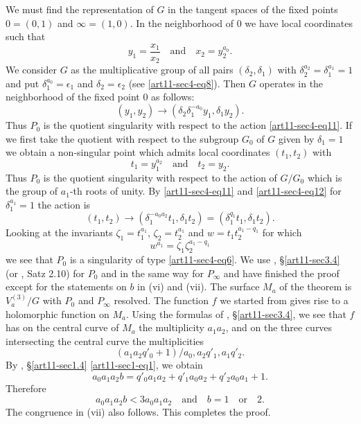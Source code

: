 We must find the representation of $G$ in the tangent spaces of the fixed points $0=(0,1)$ and $\infty=(1,0)$. In the neighborhood of $0$ we have local coordinates such that
\begin{equation}
y_{1}=\dfrac{x_{1}}{x_{2}}\quad\text{and}\quad x_{2}=y^{a_{0}}_{2}.\label{art11-sec4-eq10}
\end{equation}
We consider $G$ as the multiplicative group of all pairs $(\delta_{2},\delta_{1})$ with $\delta^{a_{2}}_{2}=\delta^{a_{1}}_{1}=1$ and put $\delta^{a_{0}}_{1}=\epsilon_{1}$ and $\delta_{2}=\epsilon_{2}$ (see \eqref{art11-sec4-eq8}). Then $G$ operates in the neighborhood of the fixed point $0$ as follows:
\begin{equation}
(y_{1},y_{2})\to (\delta_{2}\delta^{-a_{0}}_{1}y_{1}, \delta_{1}y_{2}).\label{art11-sec4-eq11}
\end{equation}
Thus $P_{0}$ is the quotient singularity with respect to the action \eqref{art11-sec4-eq11}. If we first take the quotient with respect to the subgroup $G_{0}$ of $G$ given by $\delta_{1}=1$ we obtain a non-singular point which admits local coordinates $(t_{1},t_{2})$ with
\begin{equation}
t_{1}=y^{a_{2}}_{1}\quad\text{and}\quad t_{2}=y_{2}.\label{art11-sec4-eq12}
\end{equation}
Thus $P_{0}$ is the quotient singularity with respect to the action of $G/G_{0}$ which is the group of $a_{1}$-th roots of unity. By \eqref{art11-sec4-eq11} and \eqref{art11-sec4-eq12} for $\delta^{a_{1}}_{1}=1$ the action is
\begin{equation}
(t_{1},t_{2})\to (\delta^{-a_{0}a_{2}}_{1}t_{1},\delta_{1}t_{2})=(\delta^{q_{1}}_{1}t_{1},\delta_{1}t_{2}).\label{art11-sec4-eq13}
\end{equation}
Looking at the invariants $\zeta_{1}=t^{a_{1}}_{1}$, $\zeta_{2}=t^{a_{1}}_{2}$ and $w=t_{1}t^{a_{1}-q_{1}}_{2}$ for which
$$
w^{a_{1}}=\zeta_{1}\zeta^{a_{1}-q_{1}}_{2}
$$
we see that $P_{0}$ is a singularity of type \eqref{art11-sec4-eq6}. We use \cite{art11-key6}, \S\ref{art11-sec3.4} (or \cite{art11-key2}, Satz 2.10) for $P_{0}$ and in the same way for $P_{\infty}$ and have finished the proof except for the statements on $b$ in (vi) and (vii). The surface $M_{a}$ of the theorem is $V^{(3)}_{a}/G$ with $P_{0}$ and $P_{\infty}$ resolved. The function $f$ we started from gives rise to a holomorphic function on $M_{a}$. Using the formulas of \cite{art11-key6}, \S\ref{art11-sec3.4}, we see that $f$ has on the central curve of $M_{a}$ the multiplicity $a_{1}a_{2}$, and on the three curves intersecting the central curve the multiplicities 
$$
(a_{1}a_{2}q'_{0}+1)/a_{0},a_{2}q'_{1},a_{1}q'_{2}.
$$\pageoriginale
By \cite{art11-key6}, \S\ref{art11-sec1.4} \eqref{art11-sec1-eq1}, we obtain
$$
a_{0}a_{1}a_{2}b=q'_{0}a_{1}a_{2}+q'_{1}a_{0}a_{2}+q'_{2}a_{0}a_{1}+1.
$$
Therefore
$$
a_{0}a_{1}a_{2}b<3a_{0}a_{1}a_{2}\quad\text{and}\quad b=1\quad\text{or}\quad 2.
$$
The congruence in (vii) also follows. This completes the proof.

